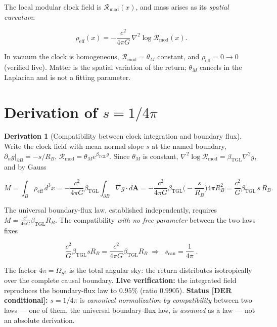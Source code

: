 \documentclass[11pt]{article}
\newcommand{\bTGL}{\beta_{\mathrm{TGL}}}\newcommand{\Msun}{M_{\odot}}\newcommand{\TGL}{\mathrm{TGL}}
\theoremstyle{definition}\newtheorem{deriv}{Derivation}
\begin{document}
The local modular clock field is $\mathcal{R}_{\mathrm{mod}}(x)$, and mass arises as its \emph{spatial curvature}:

\begin{equation}\rho_{\mathrm{eff}}(x)=-\frac{c^2}{4\pi G}\,\nabla^2\log \mathcal{R}_{\mathrm{mod}}(x).\end{equation}

In vacuum the clock is homogeneous, $\mathcal{R}_{\mathrm{mod}}=\theta_M$ constant, and $\rho_{\mathrm{eff}}=0\to 0$ (verified live). Matter is the spatial variation of the return; $\theta_M$ cancels in the Laplacian and is not a fitting parameter.

\section{Derivation of $s=1/4\pi$}

\begin{deriv}[Compatibility between clock integration and boundary flux]

Write the clock field with mean normal slope $s$ at the named boundary, $\partial_n g|_{\partial B}=-s/R_B$, $\mathcal{R}_{\mathrm{mod}}=\theta_M e^{\bTGL g}$. Since $\theta_M$ is constant, $\nabla^2\log\mathcal{R}_{\mathrm{mod}}=\bTGL\nabla^2 g$, and by Gauss

\begin{equation}M=\int_B\rho_{\mathrm{eff}}\,d^3x=-\frac{c^2}{4\pi G}\bTGL\!\int_{\partial B}\!\nabla g\cdot d\mathbf{A}=-\frac{c^2}{4\pi G}\bTGL\Big(\!-\frac{s}{R_B}\Big)4\pi R_B^2=\frac{c^2}{G}\bTGL\,s\,R_B.\end{equation}

The universal boundary-flux law, established independently, requires $M=\frac{c^2}{4\pi G}\bTGL R_B$. The compatibility \emph{with no free parameter} between the two laws fixes

\begin{equation}\frac{c^2}{G}\bTGL s R_B=\frac{c^2}{4\pi G}\bTGL R_B\;\Longrightarrow\;\boxed{\;s_{\mathrm{can}}=\frac{1}{4\pi}\;}.\end{equation}

The factor $4\pi=\Omega_{S^2}$ is the total angular sky: the return distributes isotropically over the complete causal boundary. \textbf{Live verification:} the integrated field reproduces the boundary-flux law to $0.95\%$ (ratio $0.9905$). \textbf{Status \textsf{[DER conditional]}:} $s=1/4\pi$ is \emph{canonical normalization by compatibility} between two laws --- one of them, the universal boundary-flux law, is \emph{assumed} as a law --- not an absolute derivation.\end{deriv}
\end{document}
